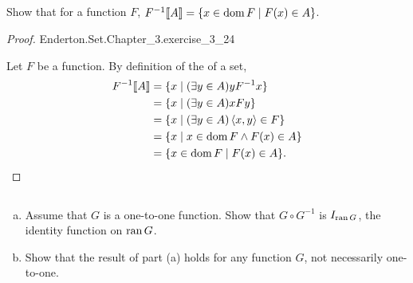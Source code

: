 \documentclass{report}
\begin{document}
\subsection{}%
\label{sub:exercise-3.24}

Show that for a function $F$,
  $F^{-1}\!\left\llbracket A\right\rrbracket = \{x \in \mathop{\text{dom}}{F} \mid F(x) \in A\}$.

\begin{proof}

    {Enderton.Set.Chapter\_3.exercise\_3\_24}

  Let $F$ be a function.
  By definition of the  of a set,
    \begin{align*}
      F^{-1}\!\left\llbracket A\right\rrbracket
        & = \{x \mid (\exists y \in A) yF^{-1}x\} \\
        & = \{x \mid (\exists y \in A) xFy\} \\
        & = \{x \mid (\exists y \in A) \left< x, y \right> \in F\} \\
        & = \{x \mid x \in \mathop{\text{dom}}{F} \land F(x) \in A\} \\
        & = \{x \in \mathop{\text{dom}}{F} \mid F(x) \in A\}.
    \end{align*}

\end{proof}

\subsection{}%
\label{sub:exercise-3.25}

\begin{enumerate}[(a)]
  \item Assume that $G$ is a one-to-one function.
    Show that $G \circ G^{-1}$ is $I_{\mathop{\text{ran}}{G}}$, the identity function on
      $\mathop{\text{ran}}{G}$.
  \item Show that the result of part (a) holds for any function $G$, not
    necessarily one-to-one.
\end{enumerate}
\end{document}
